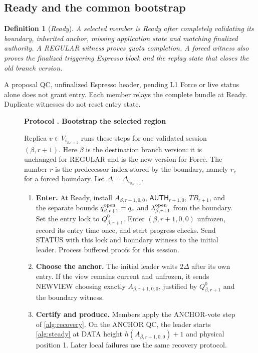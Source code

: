 \documentclass[11pt,a4paper]{article}
\newcommand{\TB}{\mathit{TB}}
\newcommand{\tagg}[1]{\ensuremath{\mathsf{#1}}}
\newcommand{\defterm}[1]{\textcolor{rrBlue}{\textit{#1}}}
\newtheorem{definition}{Definition}[section]
\newcounter{protocol}
\newenvironment{protocol}[3][htbp]{\begin{figure}[#1]\refstepcounter{protocol}\label{#2}
\begin{mdframed}[linewidth=.6pt,skipabove=0pt,skipbelow=0pt,
innertopmargin=7pt,innerbottommargin=7pt]\small
\textbf{Protocol \theprotocol. #3}\par\smallskip}{\end{mdframed}\end{figure}}
\begin{document}
\subsection{Ready and the common bootstrap}
\label{sec:ready}
\begin{definition}[\defterm{Ready}]
\label{def:ready}
A selected member is Ready after completely validating its boundary,
inherited anchor, missing application state and matching finalized
authority. A REGULAR witness proves quota completion. A forced witness
also proves the finalized triggering Espresso block and the replay
state that closes the old branch version.
\end{definition}
A proposal QC, unfinalized Espresso header, pending L1 Force or live
status alone does not grant entry. Each member relays the complete
bundle at Ready. Duplicate witnesses do not reset entry state.

\begin{protocol}[H]{alg:bootstrap}{Bootstrap the selected region}
Replica $v\in V_{i_{\beta,r+1}}$ runs these steps for one validated
session $(\beta,r+1)$. Here $\beta$ is the destination branch version:
it is unchanged for REGULAR and is the new version for Force.
The number $r$ is the predecessor index stored by the boundary,
namely $r_c$ for a forced boundary. Let
$\Delta=\Delta_{i_{\beta,r+1}}$.
\begin{enumerate}[label=\textbf{\arabic*)},itemsep=3pt]
\item \textbf{Enter.} At Ready, install $A_{\beta,r+1,0,0}$,
$\tagg{AUTH}_{r+1,0}$, $\TB_{r+1}$, and the separate bounds $q^{\rm open}_{\beta,r+1}=q_s$ and
$\lambda^{\rm open}_{\beta,r+1}$ from the boundary. Set the entry lock
to $Q^0_{\beta,r+1}$. Enter $(\beta,r+1,0,0)$ unfrozen, record its entry time once,
and start progress checks. Send STATUS with this lock and boundary
witness to the initial leader. Process buffered proofs for this session.
\item \textbf{Choose the anchor.} The initial leader waits $2\Delta$
after its own entry. If the view remains current and unfrozen, it sends
NEWVIEW choosing exactly $A_{\beta,r+1,0,0}$, justified by $Q^0_{\beta,r+1}$ and
the boundary witness.
\item \textbf{Certify and produce.} Members apply the ANCHOR-vote step
of \cref{alg:recovery}. On the ANCHOR QC, the leader starts
\cref{alg:steady} at DATA height $h(A_{\beta,r+1,0,0})+1$ and physical
position 1. Later local failures use the same recovery protocol.
\end{enumerate}
\end{protocol}
\end{document}
